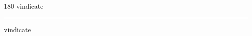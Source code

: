 
\begin{frame}
\begin{center}
\begin{turn}{180}
{\fontsize{2.5cm}{1em}\selectfont vindicate}
\end{turn}
\vspace{1em}\par  
\hrule
\vspace{1em}\par  
{\fontsize{2.5cm}{1em}\selectfont vindicate}
\end{center}
\end{frame}
